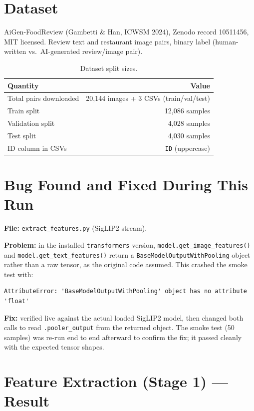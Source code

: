 \documentclass[11pt]{article}
\begin{document}
\section{Dataset}

AiGen-FoodReview (Gambetti \& Han, ICWSM 2024), Zenodo record 10511456, MIT licensed. Review text and restaurant image pairs, binary label (human-written vs.\ AI-generated review/image pair).

\begin{table}[h]
\centering
\begin{tabular}{lr}
\toprule
\textbf{Quantity} & \textbf{Value} \\
\midrule
Total pairs downloaded & 20{,}144 images + 3 CSVs (train/val/test) \\
Train split & 12{,}086 samples \\
Validation split & 4{,}028 samples \\
Test split & 4{,}030 samples \\
ID column in CSVs & \texttt{ID} (uppercase) \\
\bottomrule
\end{tabular}
\caption{Dataset split sizes.}
\end{table}

\section{Bug Found and Fixed During This Run}

\textbf{File:} \texttt{extract\_features.py} (SigLIP2 stream).

\textbf{Problem:} in the installed \texttt{transformers} version, \texttt{model.get\_image\_features()} and \texttt{model.get\_text\_features()} return a \texttt{BaseModelOutputWithPooling} object rather than a raw tensor, as the original code assumed. This crashed the smoke test with:

\begin{lstlisting}
AttributeError: 'BaseModelOutputWithPooling' object has no attribute 'float'
\end{lstlisting}

\textbf{Fix:} verified live against the actual loaded SigLIP2 model, then changed both calls to read \texttt{.pooler\_output} from the returned object. The smoke test (50 samples) was re-run end to end afterward to confirm the fix; it passed cleanly with the expected tensor shapes.

\section{Feature Extraction (Stage 1) --- Result}
\end{document}
